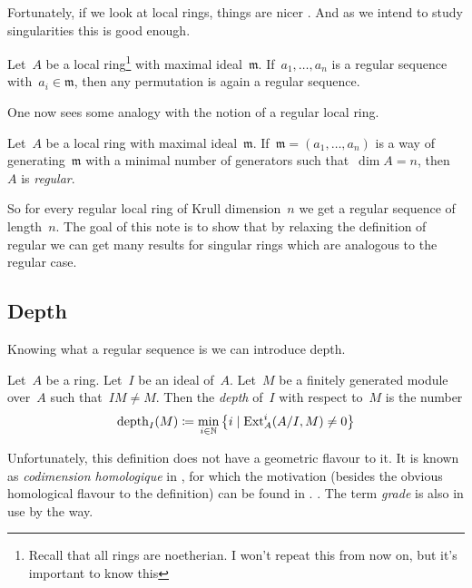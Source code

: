 \documentclass[10pt,a4paper]{article}
\begin{document}
Fortunately, if we look at local rings, things are nicer \cite[corollary 17.2]{eisenbud-commutative-algebra}. And as we intend to study singularities this is good enough.
\begin{corollary}
  Let~$A$ be a local ring\footnote{Recall that all rings are noetherian. I won't repeat this from now on, but it's important to know this} with maximal ideal~$\mathfrak{m}$. If~$a_1,\dotsc,a_n$ is a regular sequence with~$a_i\in\mathfrak{m}$, then any permutation is again a regular sequence.
\end{corollary}
One now sees some analogy with the notion of a regular local ring.
\begin{definition}
  Let~$A$ be a local ring with maximal ideal~$\mathfrak{m}$. If~$\mathfrak{m}=(a_1,\dotsc,a_n)$ is a way of generating~$\mathfrak{m}$ with a minimal number of generators such that~$\dim A=n$, then~$A$ is \emph{regular}.
\end{definition}
So for every regular local ring of Krull dimension~$n$ we get a regular sequence of length~$n$. The goal of this note is to show that by relaxing the definition of regular we can get many results for singular rings which are analogous to the regular case.

\subsection{Depth}
Knowing what a regular sequence is we can introduce depth.
\begin{definition}
  Let~$A$ be a ring. Let~$I$ be an ideal of~$A$. Let~$M$ be a finitely generated module over~$A$ such that~$IM\neq M$. Then the \emph{depth} of~$I$ with respect to~$M$ is the number
  \begin{equation}
    \operatorname{depth}_I(M)\coloneqq\min_{i\in\mathbb{N}}\left\{ i\mid\operatorname{Ext}_A^i(A/I,M)\neq 0 \right\}
  \end{equation}
\end{definition}
Unfortunately, this definition does not have a geometric flavour to it. It is known as \emph{codimension homologique} in \cite{serre-algebre-locale}, for which the motivation (besides the obvious homological flavour to the definition) can be found in \cite[proposition 21]{serre-algebre-locale}.
. The term \emph{grade} is also in use by the way.
\end{document}
